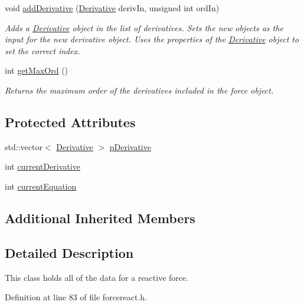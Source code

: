\begin{DoxyCompactItemize}
void \hyperlink{classosea_1_1ofreq_1_1_force_react_a7f860f5726f2f9f9baba9775dc72f1ff}{add\-Derivative} (\hyperlink{classosea_1_1ofreq_1_1_derivative}{Derivative} deriv\-In, unsigned int ord\-In)
\begin{DoxyCompactList}\small\item\em Adds a \hyperlink{classosea_1_1ofreq_1_1_derivative}{Derivative} object in the list of derivatives. Sets the new objects as the input for the new derivative object. Uses the properties of the \hyperlink{classosea_1_1ofreq_1_1_derivative}{Derivative} object to set the correct index. \end{DoxyCompactList}\item 
int \hyperlink{classosea_1_1ofreq_1_1_force_react_ae11cdc98d818ca97f710ed13e584c53f}{get\-Max\-Ord} ()
\begin{DoxyCompactList}\small\item\em Returns the maximum order of the derivatives included in the force object. \end{DoxyCompactList}\end{DoxyCompactItemize}
\subsection*{Protected Attributes}
\begin{DoxyCompactItemize}
\item 
std\-::vector$<$ \hyperlink{classosea_1_1ofreq_1_1_derivative}{Derivative} $>$ \hyperlink{classosea_1_1ofreq_1_1_force_react_a28d2bfdc97809181be4d21713cc52181}{p\-Derivative}
\item 
int \hyperlink{classosea_1_1ofreq_1_1_force_react_a56c47ef95ad9ac1876b832dbf75297dd}{current\-Derivative}
\item 
int \hyperlink{classosea_1_1ofreq_1_1_force_react_a35b2a5464dd0135961e04a8389f5967f}{current\-Equation}
\end{DoxyCompactItemize}
\subsection*{Additional Inherited Members}


\subsection{Detailed Description}
This class holds all of the data for a reactive force. 

Definition at line 83 of file forcereact.\-h.



